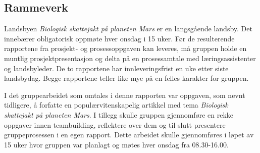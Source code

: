 \subsection{Rammeverk}

Landsbyen \textit{Biologisk skattejakt på planeten Mars} er en langsgående landsby.
Det innebærer obligatorisk oppmøte hver onsdag i 15 uker. Før de resulterende rapportene fra prosjekt- og prosessoppgaven kan leveres, må gruppen holde en muntlig prosjektpresentasjon og delta på en prosessamtale med læringsassistenter og landsbyleder.
De to rapportene har innleveringsfrist en uke etter siste landsbydag. Begge rapportene teller like mye på en felles karakter for gruppen.

I det gruppearbeidet som omtales i denne rapporten var oppgaven, som nevnt tidligere, å forfatte en populærvitenskapelig artikkel med tema \textit{Biologisk skattejakt på planeten Mars}. I tillegg skulle gruppen gjennomføre en rekke oppgaver innen teambuilding, reflektere over dem og til slutt presentere gruppeprosessen i en egen rapport. 
Dette arbeidet skulle gjennomføres i løpet av 15 uker hvor gruppen var planlagt og møtes hver onsdag fra 08.30-16.00.